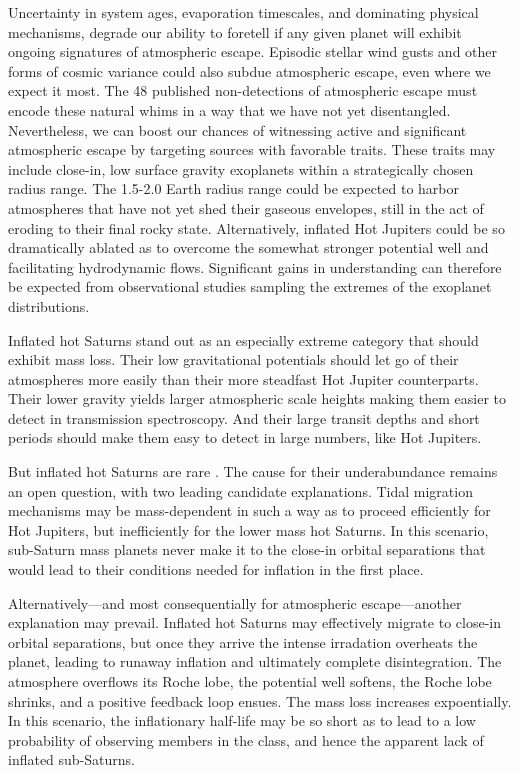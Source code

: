 \documentclass[twocolumn]{aastex631}
\begin{document}
Uncertainty in system ages, evaporation timescales, and dominating physical mechanisms, degrade our ability to foretell if any given planet will exhibit ongoing signatures of atmospheric escape.  Episodic stellar wind gusts and other forms of cosmic variance could also subdue atmospheric escape, even where we expect it most.  The 48 published non-detections of atmospheric escape \citep{2022arXiv221116243D} must encode these natural whims in a way that we have not yet disentangled. Nevertheless, we can boost our chances of witnessing active and significant atmospheric escape by targeting sources with favorable traits.  These traits may include close-in, low surface gravity exoplanets within a strategically chosen radius range.  The 1.5-2.0 Earth radius range could be expected to harbor atmospheres that have not yet shed their gaseous envelopes, still in the act of eroding to their final rocky state.  Alternatively, inflated Hot Jupiters could be so dramatically ablated as to overcome the somewhat stronger potential well and facilitating hydrodynamic flows.  Significant gains in understanding can therefore be expected from observational studies sampling the extremes of the exoplanet distributions.

Inflated hot Saturns stand out as an especially extreme category that should exhibit mass loss.  Their low gravitational potentials should let go of their atmospheres more easily than their more steadfast Hot Jupiter counterparts.  Their lower gravity yields larger atmospheric scale heights making them easier to detect in transmission spectroscopy.  And their large transit depths and short periods should make them easy to detect in large numbers, like Hot Jupiters.

But inflated hot Saturns are rare \citep{2018AJ....155..214T}.  The cause for their underabundance remains an open question, with two leading candidate explanations.  Tidal migration mechanisms may be mass-dependent in such a way as to proceed efficiently for Hot Jupiters, but inefficiently for the lower mass hot Saturns.  In this scenario, sub-Saturn mass planets never make it to the close-in orbital separations that would lead to their conditions needed for inflation in the first place.

Alternatively---and most consequentially for atmospheric escape---another explanation may prevail.  Inflated hot Saturns may effectively migrate to close-in orbital separations, but once they arrive the intense irradation overheats the planet, leading to runaway inflation and ultimately complete disintegration.  The atmosphere overflows its Roche lobe, the potential well softens, the Roche lobe shrinks, and a positive feedback loop ensues. The mass loss increases expoentially.  In this scenario, the inflationary half-life may be so short as to lead to a low probability of observing members in the class, and hence the apparent lack of inflated sub-Saturns.
\end{document}
